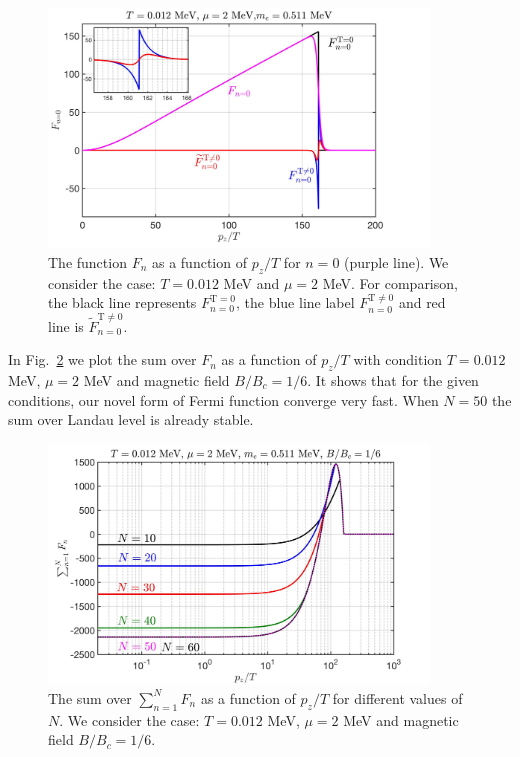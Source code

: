 \documentclass[sn-mathphys,Numbered]{sn-jnl}
\begin{document}
\begin{figure}[ht]
\centering
\includegraphics[width=0.9\textwidth]{./plot/NewFermi_Background}
\caption{The function $F_n$ as a function of $p_z/T$ for $n=0$ (purple line). We consider the case: $T=0.012$ MeV and $\mu=2$ MeV. For comparison, the black line represents $F_{n=0}^{\mathrm{T=0}}$, the blue line label $F_{n=0}^{\mathrm{T\neq0}}$ and red line is $\tilde F_{n=0}^{\mathrm{T\neq0}}$.}
\label{F0_Checking}
\end{figure}

In Fig.~\ref{Fn_Checking} we plot the sum over $F_n$ as a function of $p_z/T$ with condition $T=0.012$ MeV, $\mu=2$ MeV and magnetic field $B/B_c=1/6$. It shows that for the given conditions, our novel form of Fermi function converge very fast. When $N=50$ the sum over Landau level is already stable.

\begin{figure}[ht]
\centering
\includegraphics[width=0.9\textwidth]{./plot/NewFermi_SumChecking}
\caption{The sum over  $\sum_{n=1}^NF_n$ as a function of $p_z/T$ for different values of $N$. We consider the case: $T=0.012$ MeV, $\mu=2$ MeV and magnetic field $B/B_c=1/6$.}
\label{Fn_Checking}
\end{figure}
\end{document}
